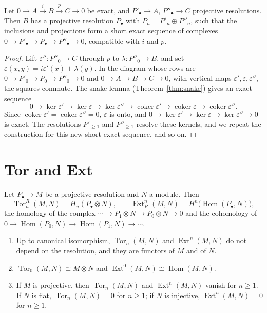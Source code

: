 \begin{lemma}\label{lem:horseshoe}
Let $0\to A\xrightarrow iB\xrightarrow pC\to0$ be exact, and $P'_\bullet\to A$, $P''_\bullet\to C$ projective resolutions. Then $B$ has a projective resolution $P_\bullet$ with $P_n=P'_n\oplus P''_n$, such that the inclusions and projections
form a short exact sequence of complexes $0\to P'_\bullet\to P_\bullet\to P''_\bullet\to0$, compatible with $i$ and $p$.
\end{lemma}

\begin{proof}
Lift $\varepsilon''\colon P''_0\to C$ through $p$ to $\lambda\colon P''_0\to B$, and set $\varepsilon(x,y)=i\varepsilon'(x)+\lambda(y)$. In the diagram whose rows are $0\to P'_0\to P_0\to P''_0\to0$ and $0\to A\to B\to C\to0$, with vertical maps
$\varepsilon',\varepsilon,\varepsilon''$, the squares commute. The snake lemma (Theorem~\ref{thm:snake}) gives an exact sequence
\[
0\to\ker\varepsilon'\to\ker\varepsilon\to\ker\varepsilon''\to\operatorname{coker}\varepsilon'\to\operatorname{coker}\varepsilon\to\operatorname{coker}\varepsilon''.
\]
Since $\operatorname{coker}\varepsilon'=\operatorname{coker}\varepsilon''=0$, $\varepsilon$ is onto, and $0\to\ker\varepsilon'\to\ker\varepsilon\to\ker\varepsilon''\to0$ is exact. The resolutions $P'_{\ge1}$ and $P''_{\ge1}$ resolve these kernels,
and we repeat the construction for this new short exact sequence, and so on.
\end{proof}

\section{Tor and Ext}

\begin{definition}\label{def:torext}
Let $P_\bullet\to M$ be a projective resolution and $N$ a module. Then
\[
\operatorname{Tor}_n^R(M,N)=H_n(P_\bullet\otimes N),\qquad\operatorname{Ext}^n_R(M,N)=H^n\bigl(\operatorname{Hom}(P_\bullet,N)\bigr),
\]
the homology of the complex $\cdots\to P_1\otimes N\to P_0\otimes N\to0$ and the cohomology of $0\to\operatorname{Hom}(P_0,N)\to\operatorname{Hom}(P_1,N)\to\cdots$.
\end{definition}

\begin{proposition}\label{prop:torextbasic}
\leavevmode
\begin{enumerate}[label=(\alph*)]
\item Up to canonical isomorphism, $\operatorname{Tor}_n(M,N)$ and $\operatorname{Ext}^n(M,N)$ do not depend on the resolution, and they are functors of $M$ and of $N$.
\item $\operatorname{Tor}_0(M,N)\cong M\otimes N$ and $\operatorname{Ext}^0(M,N)\cong\operatorname{Hom}(M,N)$.
\item If $M$ is projective, then $\operatorname{Tor}_n(M,N)$ and $\operatorname{Ext}^n(M,N)$ vanish for $n\ge1$. If $N$ is flat, $\operatorname{Tor}_n(M,N)=0$ for $n\ge1$; if $N$ is injective, $\operatorname{Ext}^n(M,N)=0$ for $n\ge1$.
\end{enumerate}
\end{proposition}

